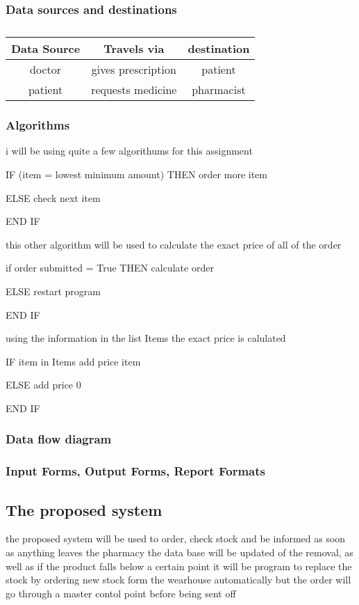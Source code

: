 \subsubsection{Data sources and destinations}
\begin{table}[t]
\begin{flushleft}
\begin{tabular}{|c|c|c|}
\hline
Data Source & Travels via & destination\\
\hline
doctor & gives prescription & patient\\
\hline
patient & requests medicine & pharmacist\\
\hline

\hline
\end{tabular}
\caption{}
\label{tab:}
\end{flushleft}
\end{table}
\subsubsection{Algorithms}

i will be using quite a few algorithums for this assignment

IF (item = lowest minimum amount) THEN
		order more item

ELSE
		check next item

END IF

this other algorithm will be used to calculate the exact price of all of the order 

if order submitted = True THEN
		calculate order

ELSE 
		restart program

END IF

using the information in the list Items the exact price is calulated

IF item in Items
		add price item

ELSE
		add price 0

END IF

\subsubsection{Data flow diagram}
\subsubsection{Input Forms, Output Forms, Report Formats}

\subsection{The proposed system}
the proposed system will be used to order, check stock and be informed as soon as anything leaves the pharmacy the data base will be updated of the removal, as well as if the product falls below a certain point it will be program to replace the stock by ordering new stock form the wearhouse automatically but the order will go through a master contol point before being sent off 
